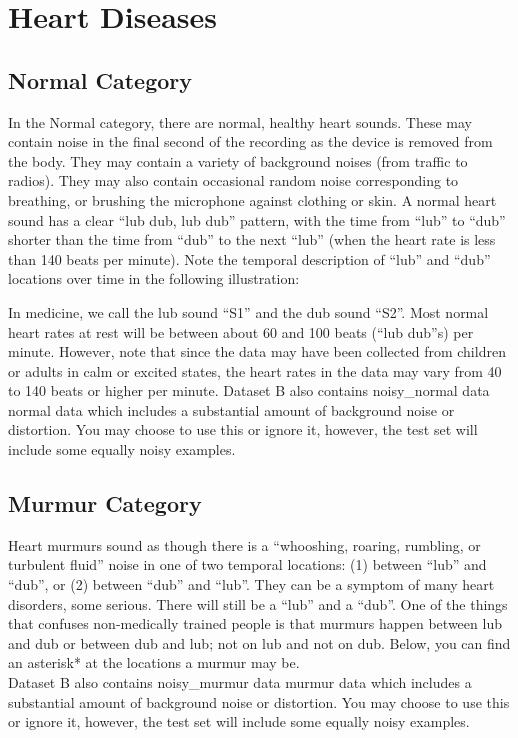 \section{Heart Diseases}

\subsection{Normal Category}
In the Normal category, there are normal, healthy heart sounds. These may contain noise in the final second of the recording as the device is removed from the body.
They may contain a variety of background noises (from traffic to radios). They may also contain occasional random noise corresponding to breathing, or brushing the
microphone against clothing or skin. A normal heart sound has a clear ``lub dub, lub dub'' pattern, with the time from ``lub'' to ``dub'' shorter than the time from ``dub'' to the next
``lub'' (when the heart rate is less than 140 beats per minute). Note the temporal description of ``lub'' and ``dub'' locations over time in the following illustration:

In medicine, we call the lub sound ``S1'' and the dub sound ``S2''. Most normal heart rates at rest will be between about 60 and 100 beats (``lub dub''s) per minute.
However, note that since the data may have been collected from children or adults in calm or excited states,
the heart rates in the data may vary from 40 to 140 beats or higher per minute. Dataset B also contains noisy\_normal data
normal data which includes a substantial amount of background noise or distortion. You may choose to use this or ignore it,
however, the test set will include some equally noisy examples.

\subsection{Murmur Category}
Heart murmurs sound as though there is a ``whooshing, roaring, rumbling, or turbulent fluid'' noise in one of two temporal locations: (1) between ``lub'' and ``dub'', or (2) between ``dub'' and ``lub''.
They can be a symptom of many heart disorders, some serious. There will still be a ``lub'' and a ``dub''. One of the things that confuses non-medically trained people is that murmurs happen
between lub and dub or between dub and lub; not on lub and not on dub. Below, you can find an asterisk* at the locations a murmur may be.\\
Dataset B also contains noisy\_murmur data murmur data which includes a substantial amount of background noise or distortion. You may choose to use this or ignore it,
however, the test set will include some equally noisy examples.

